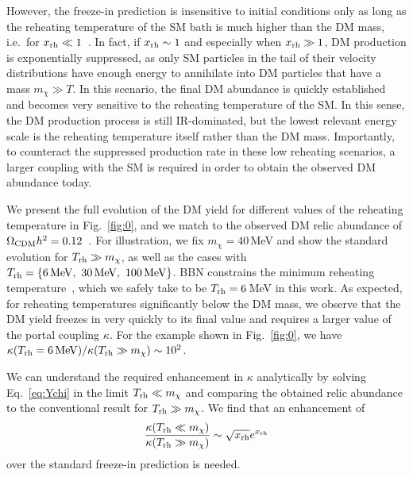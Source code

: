 \documentclass[notitlepage,nofootinbib,preprintnumbers,aps,superscriptaddress,twocolumn]{revtex4-1}
\begin{document}
However, the freeze-in prediction is insensitive to initial conditions only as long as the reheating temperature of the SM bath is much higher than the DM mass, i.e.\ for $x_{\rm rh}\ll 1$~\cite{Cosme:2023xpa,Cosme:2024ndc}. In fact, if $x_{\rm rh}\sim 1$ and especially when $x_{\rm rh}\gg 1$, DM production is exponentially suppressed, as only SM particles in the tail of their velocity distributions have enough energy to annihilate into DM particles that have a mass $m_\chi\gg T$. In this scenario, the final DM abundance is quickly established and becomes very sensitive to the reheating temperature of the SM. In this sense, the DM production process is still IR-dominated, but the lowest relevant energy scale is the reheating temperature itself rather than the DM mass. Importantly, to counteract the suppressed production rate in these low reheating scenarios, a larger coupling with the SM is required in order to obtain the observed DM abundance today.

We present the full evolution of the DM yield for different values of the reheating temperature in Fig.~\ref{fig:0}, and we match to the observed DM relic abundance of $\Omega_{\rm CDM}h^2=0.12$~\cite{Planck:2018vyg}. For illustration, we fix $m_\chi=40\,$MeV and show the standard evolution for $T_{\rm{rh}}\gg m_\chi$, as well as the cases with $T_{\rm rh}=\{6\,\mathrm{MeV},\,\,30\,\mathrm{MeV},\,\,100\,\mathrm{MeV}\}$. BBN constrains the minimum reheating temperature~\cite{Hasegawa:2019jsa,Kawasaki:2000en}, which we safely take to be $T_{\rm rh}=6\,$MeV in this work. As expected, for reheating temperatures significantly below the DM mass, we observe that the DM yield freezes in very quickly to its final value and requires a larger value of the portal coupling $\kappa$. For the example shown in Fig.~\ref{fig:0}, we have $\kappa(T_{\rm rh}=6\,\mathrm{MeV})/\kappa(T_{\rm rh}\gg m_\chi)\sim 10^{2}$.

We can understand the required enhancement in $\kappa$ analytically by solving Eq.~\eqref{eq:Ychi} in the limit $T_{\rm rh}\ll m_\chi$ and comparing the obtained relic abundance to the conventional result for $T_{\rm{rh}}\gg m_\chi$. We find that an enhancement of
\begin{equation}
    \frac{\kappa(T_{\rm rh}\ll m_\chi)}{\kappa (T_{\rm rh}\gg m_\chi)}\sim \sqrt{ x_{\rm rh}}e^{x_{\rm{rh}}} \label{eq:kappa}
\end{equation}
over the standard freeze-in prediction is needed.
\end{document}

